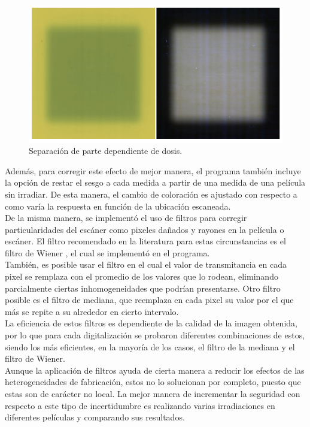 \begin{figure}
	\centering
	\includegraphics[width=0.7\linewidth]{images/imagenMicke.png}
	
	\caption{Separación de parte dependiente de dosis\cite{Micke2011}.}
	\label{fig:Multicanal}
\end{figure}

Además, para corregir este efecto de mejor manera, el programa también incluye la opción de restar el sesgo a cada medida a partir de una medida de una película sin irradiar. De esta manera, el cambio de coloración es ajustado con respecto a como varía la respuesta en función de la ubicación escaneada. \\

De la misma manera, se implementó el uso de filtros para corregir particularidades del escáner como pixeles dañados y rayones en la película o escáner. El filtro recomendado en la literatura para estas circunstancias es el filtro de Wiener \cite{Devic2016}, el cual se implementó en el programa. \\

También, es posible usar el filtro en el cual el valor de transmitancia en cada pixel se remplaza con el promedio de los valores que lo rodean, eliminando parcialmente ciertas inhomogeneidades que podrían presentarse. Otro filtro posible es el filtro de mediana, que reemplaza en cada pixel su valor por el que más se repite a su alrededor en cierto intervalo. \\

La eficiencia de estos filtros es dependiente de la calidad de la imagen obtenida, por lo que para cada digitalización se probaron diferentes combinaciones de estos, siendo los más eficientes, en la mayoría de los casos, el filtro de la mediana y el filtro de Wiener.\\

Aunque la aplicación de filtros ayuda de cierta manera a reducir los efectos de las heterogeneidades de fabricación, estos no lo solucionan por completo, puesto que estas son de carácter no local. La mejor manera de incrementar la seguridad con respecto a este tipo de incertidumbre es realizando varias irradiaciones en  diferentes películas y comparando sus resultados.\\


